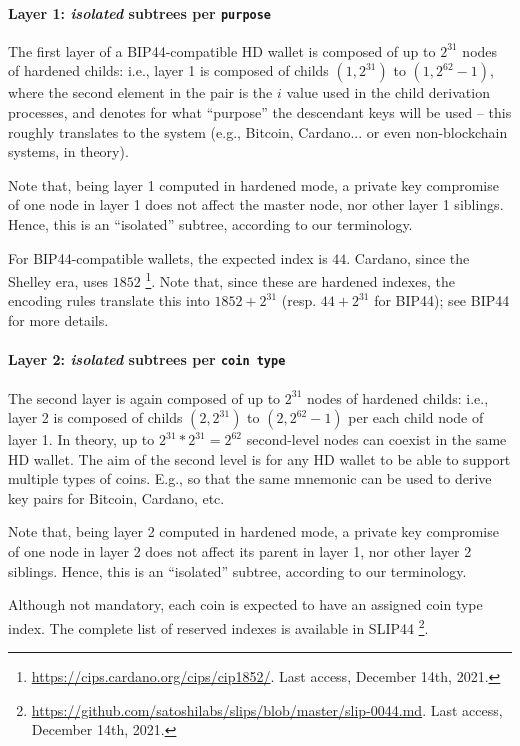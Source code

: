 \paragraph{Layer 1: \emph{isolated} subtrees per \texttt{purpose}} %
The first layer of a BIP44-compatible HD wallet is composed of up to $2^{31}$
nodes of hardened childs: i.e., layer 1 is composed of childs $(1,2^{31})$
to $(1,2^{62}-1)$, where the second element in the pair is the $i$ value used
in the child derivation processes, and denotes for what ``purpose'' the
descendant keys will be used -- this roughly translates to the system (e.g.,
Bitcoin, Cardano... or even non-blockchain systems, in theory).

Note that, being layer 1 computed in hardened mode, a private key compromise
of one node in layer 1 does not affect the master node, nor other layer 1
siblings. Hence, this is an ``isolated'' subtree, according to our terminology.

For BIP44-compatible wallets, the expected index is $44$. Cardano, since
the Shelley era, uses $1852$%
\footnote{\url{https://cips.cardano.org/cips/cip1852/}. Last access, December
  14th, 2021.}. Note that, since these are hardened indexes, the encoding
rules translate this into $1852+2^{31}$ (resp. $44+2^{31}$ for BIP44); see
BIP44 for more details.

\paragraph{Layer 2: \emph{isolated} subtrees per \texttt{coin type}} %
The second layer is again composed of up to $2^{31}$ nodes of hardened childs:
i.e., layer 2 is composed of childs $(2,2^{31})$ to $(2,2^{62}-1)$ per each child
node of layer 1. In theory, up to $2^{31}*2^{31}=2^{62}$ second-level nodes can
coexist in the same HD wallet. The aim of the second level is for any HD wallet
to be able to support multiple types of coins. E.g., so that the same mnemonic
can be used to derive key pairs for Bitcoin, Cardano, etc.

Note that, being layer 2 computed in hardened mode, a private key compromise
of one node in layer 2 does not affect its parent in layer 1, nor other layer 2
siblings. Hence, this is an ``isolated'' subtree, according to our terminology.

Although not mandatory, each coin is expected to have an assigned coin type
index. The complete list of reserved indexes is available in SLIP44%
\footnote{\url{https://github.com/satoshilabs/slips/blob/master/slip-0044.md}.
  Last access, December 14th, 2021.}.

